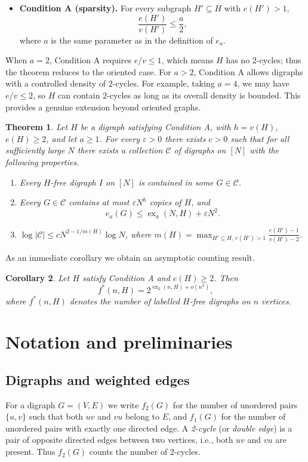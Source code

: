 \documentclass[11pt,a4paper]{article}
\newtheorem{theorem}{Theorem}[section]
\newtheorem{corollary}[theorem]{Corollary}
\DeclareMathOperator{\ex}{ex}
\newcommand{\cC}{\mathcal{C}}
\newcommand{\eps}{\varepsilon}
\begin{document}
\begin{itemize}
\item \textbf{Condition A (sparsity).} For every subgraph $H'\subseteq H$ with $e(H')>1$,
\[
\frac{e(H')}{v(H')}\le \frac{a}{2},
\]
where $a$ is the same parameter as in the definition of $e_a$.
\end{itemize}

When $a=2$, Condition A requires $e/v\le 1$, which means $H$ has no 2-cycles; thus the theorem reduces to the oriented case. For $a>2$, Condition A allows digraphs with a controlled density of 2-cycles. For example, taking $a=4$, we may have $e/v\le 2$, so $H$ can contain 2-cycles as long as its overall density is bounded. This provides a genuine extension beyond oriented graphs.

\begin{theorem}\label{thm:main}
Let $H$ be a digraph satisfying Condition A, with $h=v(H)$, $e(H)\ge2$, and let $a\ge1$. For every $\eps>0$ there exists $c>0$ such that for all sufficiently large $N$ there exists a collection $\cC$ of digraphs on $[N]$ with the following properties.
\begin{enumerate}
\item[(a)] Every $H$-free digraph $I$ on $[N]$ is contained in some $G\in\cC$.
\item[(b)] Every $G\in\cC$ contains at most $\eps N^h$ copies of $H$, and
\[
e_a(G)\le \ex_a(N,H)+\eps N^2.
\]
\item[(c)] $\displaystyle \log|\cC|\le c N^{2-1/m(H)}\log N$, where $m(H)=\max_{H'\subseteq H,\,e(H')>1}\frac{e(H')-1}{v(H')-2}$.
\end{enumerate}
\end{theorem}

As an immediate corollary we obtain an asymptotic counting result.

\begin{corollary}\label{cor:count}
Let $H$ satisfy Condition A and $e(H)\ge2$. Then
\[
f^*(n,H)=2^{\ex_2(n,H)+o(n^2)},
\]
where $f^*(n,H)$ denotes the number of labelled $H$-free digraphs on $n$ vertices.
\end{corollary}

\section{Notation and preliminaries}

\subsection{Digraphs and weighted edges}
For a digraph $G=(V,E)$ we write $f_2(G)$ for the number of unordered pairs $\{u,v\}$ such that both $uv$ and $vu$ belong to $E$, and $f_1(G)$ for the number of unordered pairs with exactly one directed edge. A \emph{2-cycle} (or \emph{double edge}) is a pair of opposite directed edges between two vertices, i.e., both $uv$ and $vu$ are present. Thus $f_2(G)$ counts the number of 2-cycles.
\end{document}
